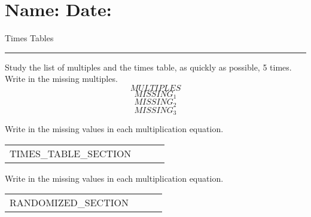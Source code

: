 \documentclass[12pt]{article}
\def \Heading {\section*{\Large Name: \underline{\hspace{8cm}} \hfill Date: \underline{\hspace{3cm}}} \vspace{-3mm}
{Times Tables} \vspace{1pt}\hrule}
\begin{document}
\Heading

\vspace{5mm}
\Large %

Study the list of multiples and the times table, as quickly as possible, 5 times. \\

Write in the missing multiples.
\[ {MULTIPLES} \]
\[ {MISSING_1} \]
\[ {MISSING_2} \]
\[ {MISSING_3} \]

Write in the missing values in each multiplication equation.
\begin{center}
\begin{tabular}{|c|c|c|c|}
\hline
{TIMES_TABLE_SECTION}
\end{tabular}
\end{center}

Write in the missing values in each multiplication equation.
\begin{center}
\begin{tabular}{|c|c|c|c|}
\hline
{RANDOMIZED_SECTION}
\end{tabular}
\end{center}
\end{document}
